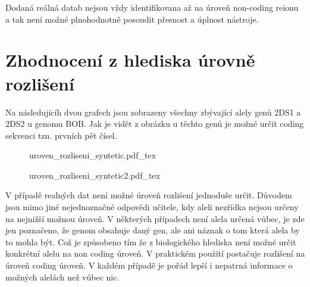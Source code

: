 \documentclass[czech,DP]{thesiskiv}
\numberwithin{equation}{section}
\begin{document}
\begin{center}
\begin{longtable}{l c|| c | c l | c l || c | c l | c l }
\end{longtable}
\label{tab:cut_quality}
\end{center}

\noindent
Dodaná reálná datab nejsou vždy identifikovana až na úroveň non-coding reionu a tak není možné plnohodnotně posoudit přesnost a úplnost nástroje. 


\chapter{Zhodnocení z hlediska úrovně rozlišení}
Na následujícíh dvou grafech jsou zobrazeny všechny zbývající alely genů 2DS1 a 2DS2 u genomu BOB. Jak je vidět z obrázku u těchto genů je možné určit coding sekvenci tzn. prvních pět čísel. 


\begin{figure}[H]
	\centering
    \def\svgwidth{\columnwidth}
    {uroven_rozliseni_syntetic.pdf_tex} 
\end{figure}

\begin{figure}[H]
	\centering
    \def\svgwidth{\columnwidth}
    {uroven_rozliseni_syntetic2.pdf_tex} 
\end{figure}

\noindent
V případě realných dat není možné úroveň rozlišení jednoduše určit. Důvodem jsou mimo jiné nejednoznačné odpovědi učitele, kdy aleli nezřídka nejsou určeny na nejnižší možnou úroveň. V některých případech není alela určená vůbec, je zde jen poznačeno, že genom obsahuje daný gen, ale ani náznak o tom která alela by to mohla být. Což je způsobeno tím že z biologického hlediska není možné určit konkrétní alelu na non coding úroveň. V praktickém použití postačuje rozlišení na úroveň coding úroveň. V každém případě je pořád lepší i nepatrná informace o možných alelách než vůbec nic.
\end{document}

